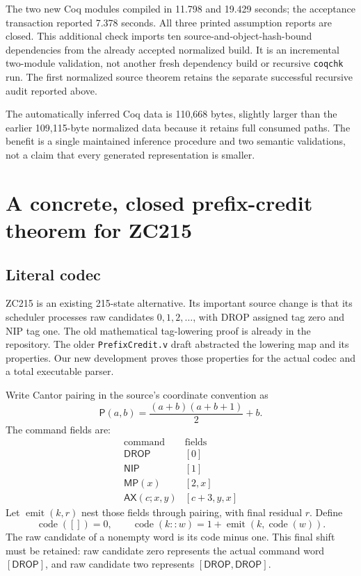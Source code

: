 \documentclass[11pt]{article}
\theoremstyle{definition}\newtheorem{definition}[theorem]{Definition}
\newcommand{\pair}[2]{\mathsf P(#1,#2)}
\newcommand{\Drop}{\mathsf{DROP}}
\newcommand{\Nip}{\mathsf{NIP}}
\newcommand{\MP}{\mathsf{MP}}
\newcommand{\AX}{\mathsf{AX}}
\begin{document}
The two new Coq modules compiled in 11.798 and 19.429 seconds; the acceptance
transaction reported 7.378 seconds. All three printed assumption reports are
closed. This additional check imports ten source-and-object-hash-bound
dependencies from the already accepted normalized build. It is an incremental
two-module validation, not another fresh dependency build or recursive
\texttt{coqchk} run. The first normalized source theorem retains the separate
successful recursive audit reported above.

The automatically inferred Coq data is 110,668 bytes, slightly larger than
the earlier 109,115-byte normalized data because it retains full consumed
paths. The benefit is a single maintained inference procedure and two semantic
validations, not a claim that every generated representation is smaller.

\section{A concrete, closed prefix-credit theorem for ZC215}

\subsection{Literal codec}

ZC215 is an existing 215-state alternative. Its important source change is that
its scheduler processes raw candidates $0,1,2,\ldots$, with DROP assigned tag
zero and NIP tag one. The old mathematical tag-lowering proof is already in
the repository. The older \texttt{PrefixCredit.v} draft abstracted the lowering
map and its properties. Our new development proves those properties for the
actual codec and a total executable parser.\cite{zc215}

Write Cantor pairing in the source's coordinate convention as
\[
 \pair ab=\frac{(a+b)(a+b+1)}2+b.
\]
The command fields are:
\[
\begin{array}{c|c}
\text{command}&\text{fields}\\\hline
\Drop &[0]\\
\Nip &[1]\\
\MP(x)&[2,x]\\
\AX(c;x,y)&[c+3,y,x]
\end{array}
\]
Let $\operatorname{emit}(k,r)$ nest those fields through pairing, with final
residual $r$. Define
\[
 \operatorname{code}([])=0,\qquad
 \operatorname{code}(k::w)=1+\operatorname{emit}(k,\operatorname{code}(w)).
\]
The raw candidate of a nonempty word is its code minus one. This final shift
must be retained: raw candidate zero represents the actual command word
$[\Drop]$, and raw candidate two represents $[\Drop,\Drop]$.
\end{document}
